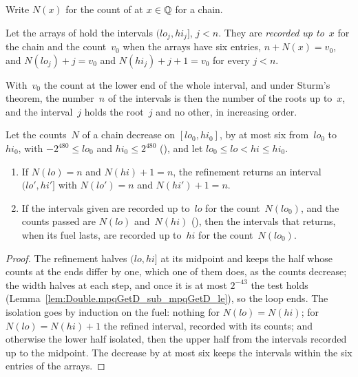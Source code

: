 Write $N(x)$ for the count of  at $x \in \mathbb{Q}$ for a chain.

\begin{definition}\label{def:RootIntervals.Isolated}
  \leanok
  Let the arrays of  hold the intervals $(lo_j, hi_j]$, $j < n$. They
  are \emph{recorded up to}~$x$ for the chain and the count~$v_0$ when the arrays have six entries,
  $n + N(x) = v_0$, and $N(lo_j) + j = v_0$ and $N(hi_j) + j + 1 = v_0$ for every $j < n$.
\end{definition}

With~$v_0$ the count at the lower end of the whole interval, and under Sturm's theorem, the
number~$n$ of the intervals is then the number of the roots up to~$x$, and the interval~$j$ holds
the root~$j$ and no other, in increasing order.

\begin{lemma}\label{lem:sturmIsolate_spec}
  \leanok
  Let the counts~$N$ of a chain decrease on $[lo_0, hi_0]$, by at most six from~$lo_0$ to~$hi_0$,
  with $-2^{480} \le lo_0$ and $hi_0 \le 2^{480}$ (), and let
  $lo_0 \le lo < hi \le hi_0$.
  \begin{enumerate}
    \item If $N(lo) = n$ and $N(hi) + 1 = n$, the refinement  returns an
      interval $(lo', hi']$ with $N(lo') = n$ and $N(hi') + 1 = n$.
    \item If the intervals given are recorded up to~$lo$ for the count~$N(lo_0)$, and the counts
      passed are $N(lo)$ and~$N(hi)$ (), then the intervals that
       returns, when its fuel lasts, are recorded up to~$hi$ for the
      count~$N(lo_0)$.
  \end{enumerate}
\end{lemma}

\begin{proof}
  \leanok
  The refinement halves $(lo, hi]$ at its midpoint and keeps the half whose counts at the ends
  differ by one, which one of them does, as the counts decrease; the width halves at each step, and
  once it is at most $2^{-43}$ the test holds (Lemma~\ref{lem:Double.mpqGetD_sub_mpqGetD_le}), so
  the loop ends. The isolation goes by induction on the fuel: nothing for $N(lo) = N(hi)$; for
  $N(lo) = N(hi) + 1$ the refined interval, recorded with its counts; and otherwise the lower half
  isolated, then the upper half from the intervals recorded up to the midpoint. The decrease by at
  most six keeps the intervals within the six entries of the arrays.
\end{proof}

